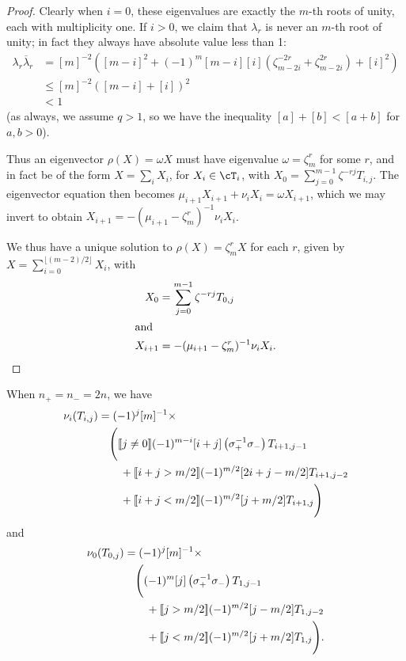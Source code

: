 \documentclass[12pt]{article}
\begin{document}
\begin{proof}
Clearly when $i = 0$, these eigenvalues are exactly the $m$-th roots of unity, each with multiplicity one.
If $i > 0$, we claim that $\lambda_{r}$ is never an $m$-th root of unity; in fact they always have absolute value less than 1:
\begin{align*}
\lambda_{r} \overline{\lambda}_{r} 
 & = [m]^{-2}\left([m-i]^{2}+(-1)^{m}[m-i][i]\left(\zeta_{m-2i}^{-2r}+\zeta_{m-2i}^{2r}\right)+[i]^{2}\right) \\ 
 & \le [m]^{-2}\left([m-i]+[i]\right)^{2} \\
 & < 1
\end{align*}
(as always, we assume $q>1$, so we have the inequality $[a] + [b] < [a+b]$ for $a,b>0$).


Thus an eigenvector $\rho(X) = \omega X$ must have eigenvalue $\omega  = \zeta_m^r$ for some $r$, and in fact be of the form $X = \sum_i X_i$, for $X_i \in \cT_i$, with $X_0 = \sum_{j=0}^{m-1} \zeta^{-rj} T_{i,j}$. The eigenvector equation then becomes $\mu_{i+1} X_{i+1} + \nu_i X_i = \omega X_{i+1}$, which we may invert to obtain $X_{i+1} = - (\mu_{i+1} - \zeta_m^r)^{-1} \nu_i X_i$.

We thus have a unique solution to $\rho(X) = \zeta_m^r X$ for each $r$, given by $X = \sum_{i=0}^{\lfloor(m-2)/2\rfloor} X_i$, with
\begin{align*}
X_0 & = \sum_{j=0}^{m-1} \zeta^{-rj} T_{0,j} \\
\intertext{and}
X_{i+1} & = - (\mu_{i+1} - \zeta_m^r)^{-1} \nu_i X_i.
\qedhere
\end{align*}
\end{proof}





\begin{lem} 
\label{lem:nu0}
When $n_+ = n_- = 2n$, we have
\begin{align*}
\nu_i(T_{i,j})
& = (-1)^j[m]^{-1} \times\\
& \quad \Bigg(
[\![ j \neq 0 ]\!](-1)^{m-i} [i+j] \left(\sigma_+^{-1} \sigma_-\right) T_{i+1, j-1} \\
& \qquad +
[\![ i+j > m/2 ]\!] (-1)^{m/2} [2i + j - m/2] T_{i+1,j-2} \\
& \qquad +
[\![ i+j < m/2 ]\!] (-1)^{m/2} [j+ m/2 ] T_{i+1,j} \Bigg)
\end{align*}
and
\begin{align*}
\nu_0(T_{0,j})
& = (-1)^j [m]^{-1} \times \\
& \quad \Bigg(
(-1)^{m} [j] \left(\sigma_+^{-1} \sigma_-\right) T_{1, j-1} \\
& \qquad + [\![ j > m/2 ]\!] (-1)^{m/2} [j- m/2] T_{1,j - 2} \\
& \qquad + [\![ j < m/2 ]\!] (-1)^{m/2} [j+ m/2] T_{1,j} \Bigg).
\end{align*}
\end{lem}
\end{document}
